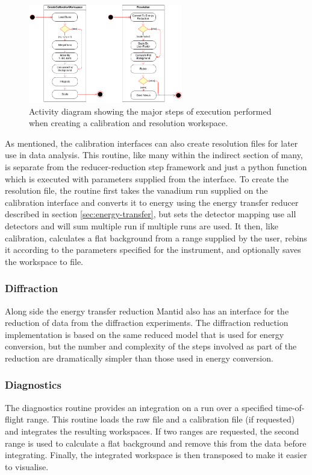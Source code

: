 \documentclass[paper=a4, fontsize=11pt]{scrartcl}	%
\numberwithin{equation}{section}															%
\numberwithin{figure}{section}																%
\numberwithin{table}{section}																%
\begin{document}
\begin{figure}[H]
\centering
\includegraphics[width=0.6\textwidth]{img/uml/activity_diagrams/Calibration_activity.png}
\caption{Activity diagram showing the major steps of execution performed when creating a calibration and resolution workspace.}
\label{fig:c2e-calibration-activity-diagram}
\end{figure}

As mentioned, the calibration interfaces can also create resolution files for later use in data analysis. This routine, like many within the indirect section of many, is separate from the reducer-reduction step  framework and just a python function which is executed with parameters supplied from the interface. To create the resolution file, the routine first takes the vanadium run supplied on the calibration interface and converts it to energy using the energy transfer reducer described in section \ref{sec:energy-transfer}, but sets the detector mapping use all detectors and will sum multiple run if multiple runs are used. It then, like calibration, calculates a flat background from a range supplied by the user, rebins it according to the parameters specified for the instrument, and optionally saves the workspace to file.

\subsubsection{Diffraction}
Along side the energy transfer reduction Mantid also has an interface for the reduction of data from the diffraction experiments. The diffraction reduction implementation is based on the same reduced model that is used for energy conversion, but the number and complexity of the steps involved as part of the reduction are dramatically simpler than those used in energy conversion. 

\subsubsection{Diagnostics}
The diagnostics routine provides an integration on a run over a specified time-of-flight range. This routine loads the raw file and a calibration file (if requested) and integrates the resulting workspaces. If two ranges are requested, the second range is used to calculate a flat background and remove this from the data before integrating. Finally, the integrated workspace is then transposed to make it easier to visualise.
\end{document}
